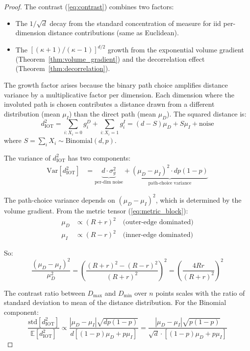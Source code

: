 \begin{proof}
The contrast (\ref{eq:contrast}) combines two factors:
\begin{itemize}
    \item The $1/\sqrt{d}$ decay from the standard concentration of measure for iid per-dimension distance contributions (same as Euclidean).
    \item The $[(\kappa+1)/(\kappa-1)]^{d/2}$ growth from the exponential volume gradient (Theorem~\ref{thm:volume_gradient}) and the decorrelation effect (Theorem~\ref{thm:decorrelation}).
\end{itemize}

The growth factor arises because the binary path choice amplifies distance variance by a multiplicative factor per dimension. Each dimension where the involuted path is chosen contributes a distance drawn from a different distribution (mean $\mu_I$) than the direct path (mean $\mu_D$). The squared distance is:
\begin{equation}
    d_{\text{IOT}}^2 = \sum_{i: X_i = 0} g_i^D + \sum_{i: X_i = 1} g_i^I = (d - S)\mu_D + S\mu_I + \text{noise}
\end{equation}
where $S = \sum_i X_i \sim \text{Binomial}(d, p)$.

The variance of $d_{\text{IOT}}^2$ has two components:
\begin{align}
    \text{Var}[d_{\text{IOT}}^2] &= \underbrace{d \cdot \sigma_g^2}_{\text{per-dim noise}} + \underbrace{(\mu_D - \mu_I)^2 \cdot dp(1-p)}_{\text{path-choice variance}}
\end{align}

The path-choice variance depends on $(\mu_D - \mu_I)^2$, which is determined by the volume gradient. From the metric tensor (\ref{eq:metric_block}):
\begin{align}
    \mu_D &\propto (R + r)^2 \quad \text{(outer-edge dominated)} \\
    \mu_I &\propto (R - r)^2 \quad \text{(inner-edge dominated)}
\end{align}

So:
\begin{equation}
    \frac{(\mu_D - \mu_I)^2}{\mu_D^2} = \left(\frac{(R+r)^2 - (R-r)^2}{(R+r)^2}\right)^2 = \left(\frac{4Rr}{(R+r)^2}\right)^2
\end{equation}

The contrast ratio between $D_{\max}$ and $D_{\min}$ over $n$ points scales with the ratio of standard deviation to mean of the distance distribution. For the Binomial component:
\begin{equation}
    \frac{\text{std}[d_{\text{IOT}}^2]}{\mathbb{E}[d_{\text{IOT}}^2]} \propto \frac{|\mu_D - \mu_I|\sqrt{dp(1-p)}}{d[(1-p)\mu_D + p\mu_I]}
    = \frac{|\mu_D - \mu_I|\sqrt{p(1-p)}}{\sqrt{d} \cdot [(1-p)\mu_D + p\mu_I]}
\end{equation}


\end{proof}
